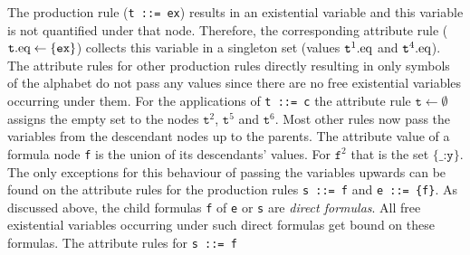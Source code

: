 The production rule (\texttt{t ::= ex}) results in an existential variable and this variable is not quantified under that node.
Therefore, the corresponding attribute rule ($\texttt{t}.\text{eq} \leftarrow \{\texttt{ex}\}$) collects this variable in a singleton set 
(values $\texttt{t}^1.\text{eq}$ and $\texttt{t}^4.\text{eq}$). 
The attribute rules for other production rules directly resulting in only symbols of the alphabet do not pass any values since there are
no free existential variables occurring under them. 
For the applications of \texttt{t ::= c} %
the attribute rule
%
 $\texttt{t}\leftarrow \emptyset$ assigns the empty set to the nodes $\texttt{t}^2$, $\texttt{t}^5$ and $\texttt{t}^6$.
Most other rules now pass the variables from the descendant nodes up to the parents. 
The attribute value  of a
 formula node \texttt{f} 
is the union of its descendants' values. For $\texttt{f}^2$ that is the set $\{\texttt{\_:y}\}$.
The only exceptions for this behaviour of passing the variables upwards can be found on the attribute rules for the production rules \texttt{s ::= f} 
and \texttt{e ::= \{f\}}. 
As discussed above, the child formulas \texttt{f} of 
\texttt{e} or \texttt{s} are \emph{direct formulas}. %
All free existential variables occurring 
under such direct formulas get bound on these formulas. The attribute rules for \texttt{s ::= f} 

